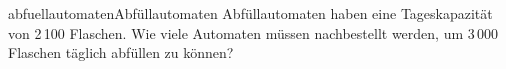 \begin{exercise}{abfuellautomaten}{Abfüllautomaten}
  \ifproblem{} Abfüllautomaten haben eine Tageskapazität von 2\,100 Flaschen. Wie viele
    Automaten müssen nachbestellt werden, um 3\,000 Flaschen täglich abfüllen zu
    können?
  \fi
\end{exercise}
